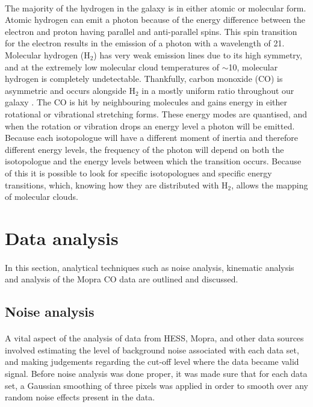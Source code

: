 \documentclass[a4paper, titlepage, oneside]{article}
\newcommand{\molec}[2]{\ensuremath{\text{#1}_{#2}}}
\begin{document}
\begin{multicols}{2}
\paragraph{}
The majority of the hydrogen in the galaxy is in either atomic or molecular form. Atomic hydrogen can emit a photon because of the energy difference between the electron and proton having parallel and anti-parallel spins. This spin transition for the electron results in the emission of a photon with a wavelength of \unit{21}{\centi\metre}. Molecular hydrogen (\molec{H}{2}) has very weak emission lines due to its high symmetry, and at the extremely low molecular cloud temperatures of \(\sim\)\unit{10}{\kelvin}, molecular hydrogen is completely undetectable. Thankfully, carbon monoxide (CO) is asymmetric and occurs alongside \molec{H}{2} in a mostly uniform ratio throughout our galaxy \parencite{Neininger:1998}. The CO is hit by neighbouring molecules and gains energy in either rotational or vibrational stretching forms. These energy modes are quantised, and when the rotation or vibration drops an energy level a photon will be emitted. Because each isotopologue will have a different moment of inertia and therefore different energy levels, the frequency of the photon will depend on both the isotopologue and the energy levels between which the transition occurs. Because of this it is possible to look for specific isotopologues and specific energy transitions, which, knowing how they are distributed with \molec{H}{2}, allows the mapping of molecular clouds.

\section{Data analysis} %
\paragraph{}
In this section, analytical techniques such as noise analysis, kinematic analysis and analysis of the Mopra CO data are outlined and discussed.

\subsection{Noise analysis}
\paragraph{}
A vital aspect of the analysis of data from HESS, Mopra, and other data sources involved estimating the level of background noise associated with each data set, and making judgements regarding the cut-off level where the data became valid signal. Before noise analysis was done proper, it was made sure that for each data set, a Gaussian smoothing of three pixels was applied in order to smooth over any random noise effects present in the data.


\end{multicols}
\end{document}
